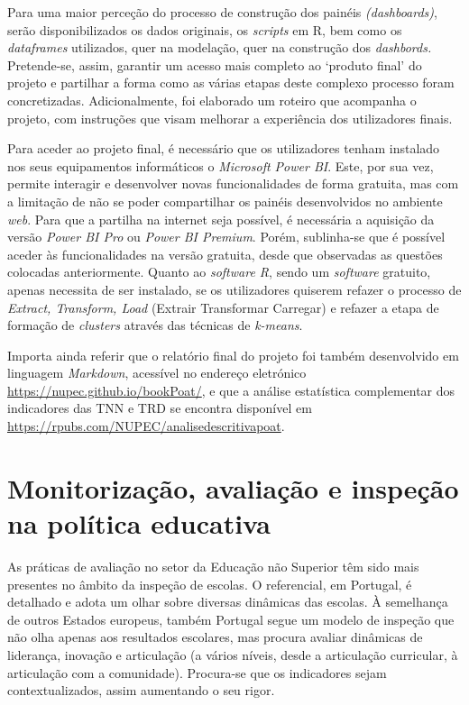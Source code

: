 \documentclass[
]{book}
\begin{document}
Para uma maior perceção do processo de construção dos painéis \emph{(dashboards)}, serão disponibilizados os dados originais, os \emph{scripts} em R, bem como os \emph{dataframes} utilizados, quer na modelação, quer na construção dos \emph{dashbords.} Pretende-se, assim, garantir um acesso mais completo ao `produto final' do projeto e partilhar a forma como as várias etapas deste complexo processo foram concretizadas. Adicionalmente, foi elaborado um roteiro que acompanha o projeto, com instruções que visam melhorar a experiência dos utilizadores finais.

Para aceder ao projeto final, é necessário que os utilizadores tenham instalado nos seus equipamentos informáticos o \emph{Microsoft Power BI}. Este, por sua vez, permite interagir e desenvolver novas funcionalidades de forma gratuita, mas com a limitação de não se poder compartilhar os painéis desenvolvidos no ambiente \emph{web}. Para que a partilha na internet seja possível, é necessária a aquisição da versão \emph{Power BI Pro} ou \emph{Power BI Premium}. Porém, sublinha-se que é possível aceder às funcionalidades na versão gratuita, desde que observadas as questões colocadas anteriormente. Quanto ao \emph{software R}, sendo um \emph{software} gratuito, apenas necessita de ser instalado, se os utilizadores quiserem refazer o processo de \emph{Extract, Transform, Load} (Extrair Transformar Carregar) e refazer a etapa de formação de \emph{clusters} através das técnicas de \emph{k-means}.

Importa ainda referir que o relatório final do projeto foi também desenvolvido em linguagem \emph{Markdown}, acessível no endereço eletrónico \url{https://nupec.github.io/bookPoat/}, e que a análise estatística complementar dos indicadores das TNN e TRD se encontra disponível em \url{https://rpubs.com/NUPEC/analisedescritivapoat}.

\hypertarget{monitorizauxe7uxe3o-avaliauxe7uxe3o-e-inspeuxe7uxe3o-na-poluxedtica-educativa}{%
\section{\texorpdfstring{\textbf{Monitorização, avaliação e inspeção na política educativa}}{Monitorização, avaliação e inspeção na política educativa}}\label{monitorizauxe7uxe3o-avaliauxe7uxe3o-e-inspeuxe7uxe3o-na-poluxedtica-educativa}}

As práticas de avaliação no setor da Educação não Superior têm sido mais presentes no âmbito da inspeção de escolas. O referencial, em Portugal, é detalhado e adota um olhar sobre diversas dinâmicas das escolas. À semelhança de outros Estados europeus, também Portugal segue um modelo de inspeção que não olha apenas aos resultados escolares, mas procura avaliar dinâmicas de liderança, inovação e articulação (a vários níveis, desde a articulação curricular, à articulação com a comunidade). Procura-se que os indicadores sejam contextualizados, assim aumentando o seu rigor.
\end{document}
